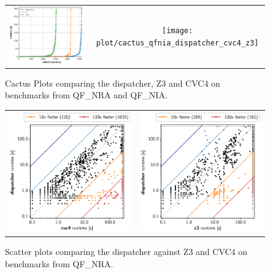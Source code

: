 \documentclass{article}
\begin{document}
\begin{figure}
\begin{center}
\begin{tabular}{cc}
\includegraphics[width=.5\textwidth]{plot/cactus_qfnra_dispatcher_cvc4_z3}
&
\texttt{[image: plot/cactus\_qfnia\_dispatcher\_cvc4\_z3]}  
\end{tabular}
\end{center}
\caption{\label{cactus}Cactus Plots comparing the dispatcher, Z3 and CVC4 on benchmarks from QF\_NRA and QF\_NIA.}
\end{figure}


\begin{figure}
\begin{center}
\begin{tabular}{cc}
\includegraphics[width=.5\textwidth]{plot/scatter_qfnra_dispatcher_cvc4}
&
\includegraphics[width=.5\textwidth]{plot/scatter_qfnra_dispatcher_z3} 
\end{tabular}
\end{center}
\caption{\label{scatternra}Scatter plots comparing the dispatcher against Z3 and CVC4 on benchmarks from QF\_NRA.}
\end{figure}
\end{document}
